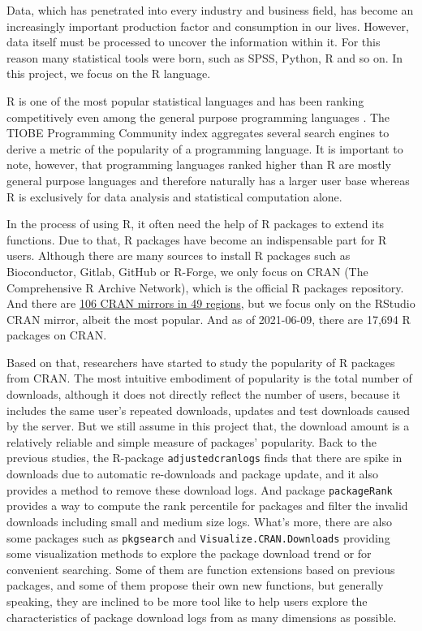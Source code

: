 \documentclass[
]{book}
\begin{document}
Data, which has penetrated into every industry and business field, has become an increasingly important production factor and consumption in our lives. However, data itself must be processed to uncover the information within it. For this reason many statistical tools were born, such as SPSS, Python, R and so on. In this project, we focus on the R language.

R is one of the most popular statistical languages and has been ranking competitively even among the general purpose programming languages \citep[peaking 8th in][]{tiobe}. The TIOBE Programming Community index aggregates several search engines to derive a metric of the popularity of a programming language. It is important to note, however, that programming languages ranked higher than R are mostly general purpose languages and therefore naturally has a larger user base whereas R is exclusively for data analysis and statistical computation alone.

In the process of using R, it often need the help of R packages to extend its functions. Due to that, R packages have become an indispensable part for R users. Although there are many sources to install R packages such as Bioconductor, Gitlab, GitHub or R-Forge, we only focus on CRAN (The Comprehensive R Archive Network), which is the official R packages repository. And there are \href{https://cran.r-project.org/mirmon_report.html}{106 CRAN mirrors in 49 regions}, but we focus only on the RStudio CRAN mirror, albeit the most popular. And as of 2021-06-09, there are 17,694 R packages on CRAN.

Based on that, researchers have started to study the popularity of R packages from CRAN. The most intuitive embodiment of popularity is the total number of downloads, although it does not directly reflect the number of users, because it includes the same user's repeated downloads, updates and test downloads caused by the server. But we still assume in this project that, the download amount is a relatively reliable and simple measure of packages' popularity. Back to the previous studies, the R-package \texttt{adjustedcranlogs}\citep{adjustedcranlogs} finds that there are spike in downloads due to automatic re-downloads and package update, and it also provides a method to remove these download logs. And package \texttt{packageRank}\citep{packageRank} provides a way to compute the rank percentile for packages and filter the invalid downloads including small and medium size logs. What's more, there are also some packages such as \texttt{pkgsearch}\citep{pkgsearch} and \texttt{Visualize.CRAN.Downloads}\citep{Visualize.CRAN.Downloads} providing some visualization methods to explore the package download trend or for convenient searching. Some of them are function extensions based on previous packages, and some of them propose their own new functions, but generally speaking, they are inclined to be more tool like to help users explore the characteristics of package download logs from as many dimensions as possible.
\end{document}
